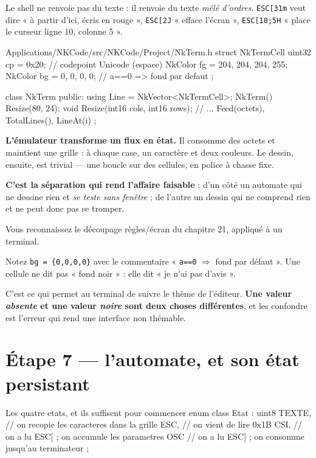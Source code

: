 Le shell ne renvoie pas du texte : il renvoie du texte \emph{mêlé d'ordres}.
\texttt{ESC[31m} veut dire « à partir d'ici, écris en rouge », \texttt{ESC[2J}
« efface l'écran », \texttt{ESC[10;5H} « place le curseur ligne 10, colonne 5 ».

\begin{nkcode}{Applications/NKCode/src/NKCode/Project/NkTerm.h}
struct NkTermCell {
        uint32 cp = 0x20;                  // codepoint Unicode (espace)
        NkColor fg = {204, 204, 204, 255};
        NkColor bg = {0, 0, 0, 0};         // a==0 => fond par defaut
};

class NkTerm {
    public:
        using Line = NkVector<NkTermCell>;
        NkTerm() { Resize(80, 24); }
        void Resize(int16 cols, int16 rows);
        // ... Feed(octets), TotalLines(), LineAt(i)
};
\end{nkcode}

\begin{nkretenir}
\textbf{L'émulateur transforme un flux en état.} Il consomme des octets et
maintient une grille : à chaque case, un caractère et deux couleurs. Le dessin,
ensuite, est trivial --- une boucle sur des cellules, en police à chasse fixe.

\textbf{C'est la séparation qui rend l'affaire faisable} : d'un côté un automate
qui ne dessine rien et \emph{se teste sans fenêtre} ; de l'autre un dessin qui ne
comprend rien et ne peut donc pas se tromper.

Vous reconnaissez le découpage règles/écran du chapitre 21, appliqué à un
terminal.
\end{nkretenir}

\begin{nkretenir}
Notez \texttt{bg = \{0,0,0,0\}} avec le commentaire « \texttt{a==0}
$\Rightarrow$ fond par défaut ». Une cellule ne dit pas « fond noir » : elle dit
« je n'ai pas d'avis ».

C'est ce qui permet au terminal de suivre le thème de l'éditeur. \textbf{Une
valeur \emph{absente} et une valeur \emph{noire} sont deux choses différentes},
et les confondre est l'erreur qui rend une interface non thémable.
\end{nkretenir}

\section{Étape 7 --- l'automate, et son état persistant}

\begin{nkcode}{Les quatre etats, et ils suffisent pour commencer}
enum class Etat : uint8 {
    TEXTE,      // on recopie les caracteres dans la grille
    ESC,        // on vient de lire 0x1B
    CSI,        // on a lu ESC[ ; on accumule les parametres
    OSC         // on a lu ESC] ; on consomme jusqu'au terminateur
};
\end{nkcode}

